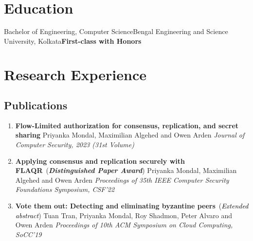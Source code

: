 \documentclass[9pt,a4paper]{moderncv}
\begin{document}
\makecvtitle
\vspace{-1cm}
\section{Education}
\vspace{0.2cm}
{Bachelor of Engineering, Computer Science}{Bengal Engineering and Science University, Kolkata}{}{\textbf{First-class with Honors}}{}
\section{Research Experience}
\vspace{0.1cm}
\hspace{-0.1cm}
\hspace{-0.1cm}
\subsection{Publications}
\begin{enumerate}
\item{\textbf{Flow-Limited authorization for consensus, replication, and secret sharing}}
\newline Priyanka Mondal, Maximilian Algehed and Owen Arden \newline
\textit{Journal of Computer Security, 2023 (31st Volume)~~}
\item{\textbf{Applying consensus and replication securely with FLAQR}}~({\textbf{\textsf{\textcolor{bittersweet}{\textit{Distinguished Paper Award}}}}})
\newline Priyanka Mondal, Maximilian Algehed and Owen Arden \newline
\textit{Proceedings of 35th IEEE Computer Security Foundations Symposium, CSF'22~~}
\item{\textbf{Vote them out: Detecting and eliminating byzantine peers}}~({\textit{\textsf{\textcolor{black}{Extended abstract}}}})
\newline Tuan Tran, Priyanka Mondal, Roy Shadmon, Peter Alvaro and Owen Arden \newline
\textit{Proceedings of 10th ACM Symposium on Cloud Computing, SoCC'19~~}
\end{enumerate}
\end{document}
